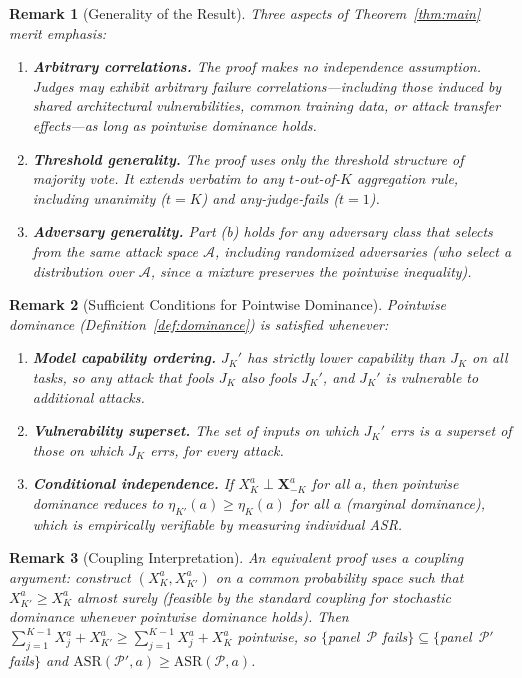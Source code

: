 \documentclass[11pt]{article}
\newtheorem*{remark}{Remark}
\begin{document}
\begin{remark}[Generality of the Result]
Three aspects of Theorem~\ref{thm:main} merit emphasis:
\begin{enumerate}[label=(\roman*)]
    \item \textbf{Arbitrary correlations.} The proof makes no independence assumption. Judges may exhibit arbitrary failure correlations---including those induced by shared architectural vulnerabilities, common training data, or attack transfer effects---as long as pointwise dominance holds.
    \item \textbf{Threshold generality.} The proof uses only the threshold structure of majority vote. It extends verbatim to any $t$-out-of-$K$ aggregation rule, including unanimity ($t = K$) and any-judge-fails ($t = 1$).
    \item \textbf{Adversary generality.} Part (b) holds for any adversary class that selects from the same attack space $\mathcal{A}$, including randomized adversaries (who select a distribution over $\mathcal{A}$, since a mixture preserves the pointwise inequality).
\end{enumerate}
\end{remark}

\begin{remark}[Sufficient Conditions for Pointwise Dominance]
Pointwise dominance (Definition~\ref{def:dominance}) is satisfied whenever:
\begin{enumerate}[label=(\roman*)]
    \item \textbf{Model capability ordering.} $J_K'$ has strictly lower capability than $J_K$ on all tasks, so any attack that fools $J_K$ also fools $J_K'$, and $J_K'$ is vulnerable to additional attacks.
    \item \textbf{Vulnerability superset.} The set of inputs on which $J_K'$ errs is a superset of those on which $J_K$ errs, for every attack.
    \item \textbf{Conditional independence.} If $X_K^a \perp \mathbf{X}_{-K}^a$ for all $a$, then pointwise dominance reduces to $\eta_{K'}(a) \geq \eta_K(a)$ for all $a$ (marginal dominance), which is empirically verifiable by measuring individual ASR.
\end{enumerate}
\end{remark}

\begin{remark}[Coupling Interpretation]
An equivalent proof uses a coupling argument: construct $(X_K^a, X_{K'}^a)$ on a common probability space such that $X_{K'}^a \geq X_K^a$ almost surely (feasible by the standard coupling for stochastic dominance whenever pointwise dominance holds). Then $\sum_{j=1}^{K-1} X_j^a + X_{K'}^a \geq \sum_{j=1}^{K-1} X_j^a + X_K^a$ pointwise, so $\{$panel~$\mathcal{P}$ fails$\} \subseteq \{$panel~$\mathcal{P}'$ fails$\}$ and $\mathrm{ASR}(\mathcal{P}', a) \geq \mathrm{ASR}(\mathcal{P}, a)$.
\end{remark}
\end{document}
